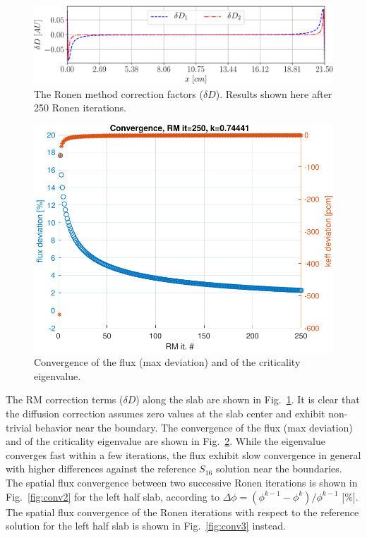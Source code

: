 \begin{figure}[htbp]
	\centering
	\includegraphics[width=0.65\linewidth]{dD_Tomatis2011_400_250it.pdf}
	\caption{The Ronen method correction factors ($\delta D$). Results shown here after 250 Ronen iterations.}
	\label{fig:slab-RM-corr-factor}
\end{figure}



\begin{figure}[htbp]
	\centering
	\includegraphics[width=0.4\linewidth]{convergence.pdf}
	\caption{Convergence of the flux (max deviation) and of the criticality
		eigenvalue.}
	\label{fig:conv}
\end{figure}

The RM correction terms ($\delta D$) along the slab are shown in Fig.~\ref{fig:slab-RM-corr-factor}. It is clear that the diffusion correction assumes zero values at the slab center and exhibit non-trivial behavior near the boundary. The convergence of the flux (max deviation) and of the criticality eigenvalue are shown in Fig.~\ref{fig:conv}. While the eigenvalue converges fast within a few iterations, the flux exhibit slow convergence in general with higher differences against the reference $S_{16}$ solution near the boundaries. The spatial flux convergence between two successive Ronen iterations is shown in Fig.~\ref{fig:conv2} for the left half slab, according to $\Delta \phi = (\phi^{k-1}-\phi^k)/\phi^{k-1}$ [\%]. The spatial flux convergence of the Ronen iterations with respect to the reference solution for the left half slab is shown in Fig.~\ref{fig:conv3} instead.

